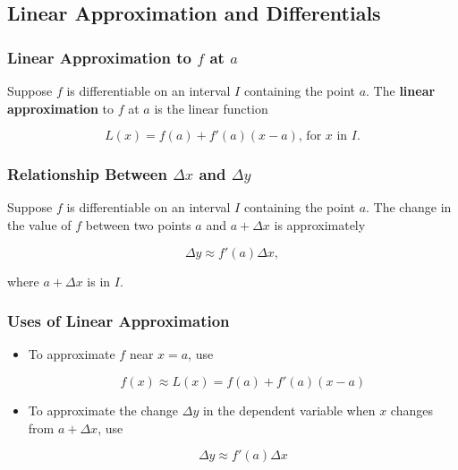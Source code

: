 %
%
%

\subsection{Linear Approximation and Differentials}
\subsubsection{Linear Approximation to $f$ at $a$}
Suppose $f$ is differentiable on an interval $I$ containing the point $a$. The \textbf{linear approximation} to $f$ at $a$ is the linear function 

\begin{equation}
    L(x) = f(a) + f'(a)(x - a)\text{, for $x$ in $I$}.
\end{equation}

\subsubsection{Relationship Between $\Delta x$ and $\Delta y$}
Suppose $f$ is differentiable on an interval $I$ containing the point $a$. The change in the value of $f$ between two points $a$ and $a + \Delta x$ is approximately 

\begin{equation}
    \Delta y \approx f'(a) \Delta x,
\end{equation}

where $a + \Delta x$ is in $I$.

\subsubsection{Uses of Linear Approximation}
\begin{itemize}
    \item To approximate $f$ near $x = a$, use

        \begin{equation}
            f(x) \approx L(x) = f(a) + f'(a)(x - a)
        \end{equation}

    \item To approximate the change $\Delta y$ in the dependent variable when $x$ changes from $a + \Delta x$, use

        \begin{equation}
            \Delta y \approx f'(a) \Delta x
        \end{equation}
\end{itemize}

